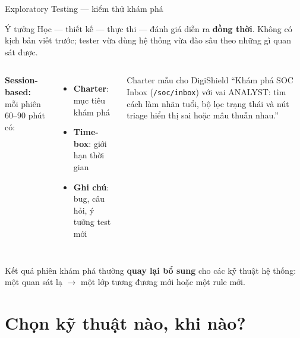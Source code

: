 \documentclass[aspectratio=169,12pt]{beamer}
\begin{document}
\begin{frame}{Exploratory Testing --- kiểm thử khám phá}
  \begin{block}{Ý tưởng}
    Học --- thiết kế --- thực thi --- đánh giá diễn ra \textbf{đồng thời}.
    Không có kịch bản viết trước; tester vừa dùng hệ thống vừa đào sâu
    theo những gì quan sát được.
  \end{block}

  \vspace{0.3em}
  \begin{columns}[T]
    {\small\textbf{Session-based:} mỗi phiên 60--90 phút có:
    \begin{itemize}
      \item \textbf{Charter}: mục tiêu khám phá
      \item \textbf{Time-box}: giới hạn thời gian
      \item \textbf{Ghi chú}: bug, câu hỏi, ý tưởng test mới
    \end{itemize}}
    \begin{exampleblock}{Charter mẫu cho DigiShield}
      \small ``Khám phá SOC Inbox (\texttt{/soc/inbox}) với vai ANALYST:
      tìm cách làm nhãn tuổi, bộ lọc trạng thái và nút triage
      hiển thị sai hoặc mâu thuẫn nhau.''
    \end{exampleblock}
  \end{columns}

  \vspace{0.3em}
  {\small Kết quả phiên khám phá thường \textbf{quay lại bổ sung} cho các kỹ
  thuật hệ thống: một quan sát lạ $\to$ một lớp tương đương mới hoặc một rule mới.}
\end{frame}

\section{Chọn kỹ thuật nào, khi nào?}
\end{document}
